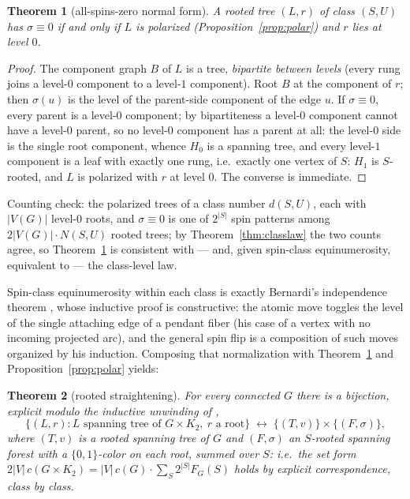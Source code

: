 \documentclass[11pt]{amsart}
\newtheorem{theorem}{Theorem}[section]
\theoremstyle{definition}
\begin{document}
\begin{theorem}[all-spins-zero normal form]\label{thm:allzero}
A rooted tree $(L,r)$ of class $(S,U)$ has $\sigma \equiv 0$ if and only if
$L$ is polarized (Proposition~\ref{prop:polar}) and $r$ lies at level $0$.
\end{theorem}

\begin{proof}
The component graph $B$ of $L$ is a tree, \emph{bipartite between levels}
(every rung joins a level-$0$ component to a level-$1$ component). Root $B$
at the component of $r$; then $\sigma(u)$ is the level of the parent-side
component of the edge $u$. If $\sigma \equiv 0$, every parent is a level-$0$
component; by bipartiteness a level-$0$ component cannot have a level-$0$
parent, so no level-$0$ component has a parent at all: the level-$0$ side is
the single root component, whence $H_0$ is a spanning tree, and every
level-$1$ component is a leaf with exactly one rung, i.e.\ exactly one
vertex of $S$: $H_1$ is $S$-rooted, and $L$ is polarized with $r$ at level
$0$. The converse is immediate.
\end{proof}

Counting check: the polarized trees of a class number $d(S,U)$, each with
$|V(G)|$ level-$0$ roots, and $\sigma\equiv 0$ is one of $2^{|S|}$ spin
patterns among $2|V(G)|\cdot N(S,U)$ rooted trees; by
Theorem~\ref{thm:classlaw} the two counts agree, so
Theorem~\ref{thm:allzero} is consistent with --- and, given spin-class
equinumerosity, equivalent to --- the class-level law.

Spin-class equinumerosity within each class is exactly Bernardi's
independence theorem \cite[Thm.~1]{bernardi}, whose inductive proof is
constructive: the atomic move toggles the level of the single attaching
edge of a pendant fiber (his case of a vertex with no incoming projected
arc), and the general spin flip is a composition of such moves organized by
his induction. Composing that normalization with
Theorem~\ref{thm:allzero} and Proposition~\ref{prop:polar} yields:

\begin{theorem}[rooted straightening]\label{thm:rooted}
For every connected $G$ there is a bijection, explicit modulo the inductive
unwinding of \cite[Thm.~1]{bernardi},
\[
  \{(L, r) : L \text{ spanning tree of } G\times K_2,\ r \text{ a root}\}
  \;\longleftrightarrow\;
  \{(T, v)\} \times \{(F, \sigma)\},
\]
where $(T,v)$ is a rooted spanning tree of $G$ and $(F,\sigma)$ an
$S$-rooted spanning forest with a $\{0,1\}$-color on each root, summed over
$S$: i.e.\ the set form
$2|V|\, c(G\times K_2) = |V|\,c(G) \cdot \sum_S 2^{|S|} F_G(S)$ holds by
explicit correspondence, class by class.
\end{theorem}
\end{document}
